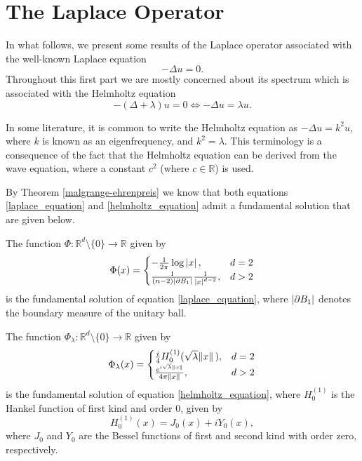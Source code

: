 \section{The Laplace Operator}
\label{section:laplace_op}

In what follows, we present some results of the Laplace operator associated with the well-known Laplace equation
\begin{equation} \label{laplace_equation}
    -\Delta u = 0.
\end{equation}
Throughout this first part we are mostly concerned about its spectrum which is associated with the Helmholtz equation
\begin{equation} \label{helmholtz_equation}
    -(\Delta+\lambda) u = 0 \iff -\Delta u = \lambda u.
\end{equation}

\begin{remark}
    In some literature, it is common to write the Helmholtz equation as \(-\Delta u = k^2 u\), where \(k\) is known as an eigenfrequency, and \(k^2 = \lambda\). This terminology is a consequence of the fact that the Helmholtz equation can be derived from the wave equation, where a constant \(c^2\) (where \(c \in \mathbb{R}\)) is used.
\end{remark}

By Theorem \ref{malgrange-ehrenpreis} we know that both equations \eqref{laplace_equation} and \eqref{helmholtz_equation} admit a fundamental solution that are given below.

\begin{proposition}
    The function \(\Phi: \mathbb{R}^d \setminus \{0\} \rightarrow \mathbb{R}\) given by
    \[
    \Phi(x) = \begin{cases}
        -\frac{1}{2 \pi} \log \abs*{x}, & d=2\\
        \frac{1}{(n-2)\abs{\partial B_1}}\frac{1}{\abs*{x}^{d-2}}, & d > 2
    \end{cases}    
    \]
    is the fundamental solution of equation \eqref{laplace_equation}, where \(\abs{\partial B_1}\) denotes the boundary measure of the unitary ball.
\end{proposition}
\begin{proposition}\label{helm_fund_sol}
    The function \(\Phi_\lambda: \mathbb{R}^d \setminus \{0\} \rightarrow \mathbb{R}\) given by
    \[
    \Phi_\lambda(x) = \begin{cases}
        \frac{i}{4} H_0^{(1)}(\sqrt{\lambda} \norm*{x}), & d=2\\
        \frac{e^{i \sqrt{\lambda} \norm*{x}}}{4 \pi \norm*{x}}, & d > 2
    \end{cases}    
    \]
    is the fundamental solution of equation \eqref{helmholtz_equation}, where \(H_0^{(1)}\) is the Hankel function of first kind and order 0, given by
    \[
        H_0^{(1)}(x) = J_0(x) + i Y_0(x),
    \]
    where \(J_0\) and \(Y_0\) are the Bessel functions of first and second kind with order zero, respectively.
\end{proposition}

